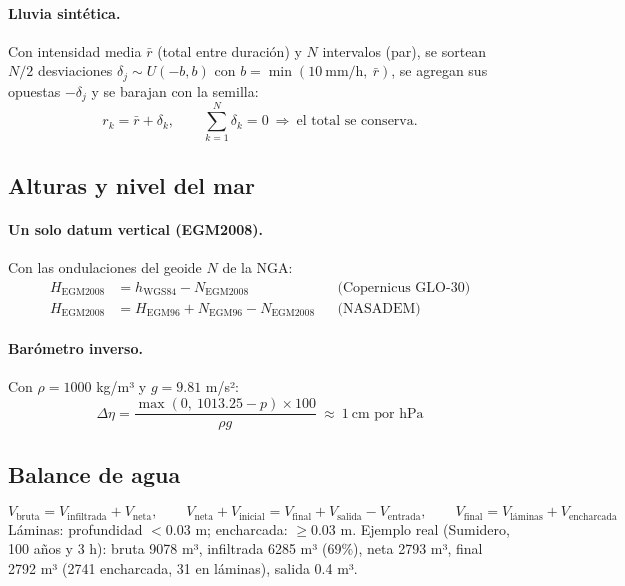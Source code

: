 \documentclass[11pt,letterpaper]{article}
\begin{document}
\paragraph{Lluvia sintética.} Con intensidad media $\bar r$ (total entre duración) y $N$ intervalos (par), se sortean $N/2$ desviaciones $\delta_j\sim U(-b,b)$ con $b=\min(10\ \text{mm/h},\ \bar r)$, se agregan sus opuestas $-\delta_j$ y se barajan con la semilla:
\begin{equation}
r_k=\bar r+\delta_k,\qquad \sum_{k=1}^{N}\delta_k=0\ \Rightarrow\ \text{el total se conserva.}
\end{equation}

\subsection{Alturas y nivel del mar}
\paragraph{Un solo datum vertical (EGM2008).} Con las ondulaciones del geoide $N$ de la NGA:
\begin{align}
H_{\text{EGM2008}}&=h_{\text{WGS84}}-N_{\text{EGM2008}} && \text{(Copernicus GLO-30)}\\
H_{\text{EGM2008}}&=H_{\text{EGM96}}+N_{\text{EGM96}}-N_{\text{EGM2008}} && \text{(NASADEM)}
\end{align}

\paragraph{Barómetro inverso.} Con $\rho=1000$ kg/m³ y $g=9.81$ m/s²:
\begin{equation}
\Delta\eta=\frac{\max(0,\ 1013.25-p)\times100}{\rho g}\ \approx\ 1\ \text{cm por hPa}
\end{equation}

\subsection{Balance de agua}
\begin{equation}
V_{\text{bruta}}=V_{\text{infiltrada}}+V_{\text{neta}},\qquad
V_{\text{neta}}+V_{\text{inicial}}=V_{\text{final}}+V_{\text{salida}}-V_{\text{entrada}},\qquad
V_{\text{final}}=V_{\text{láminas}}+V_{\text{encharcada}}
\end{equation}
Láminas: profundidad $<0.03$ m; encharcada: $\ge0.03$ m. Ejemplo real (Sumidero, 100 años y 3 h): bruta 9078 m³, infiltrada 6285 m³ (69\%), neta 2793 m³, final 2792 m³ (2741 encharcada, 31 en láminas), salida 0.4 m³.
\end{document}
